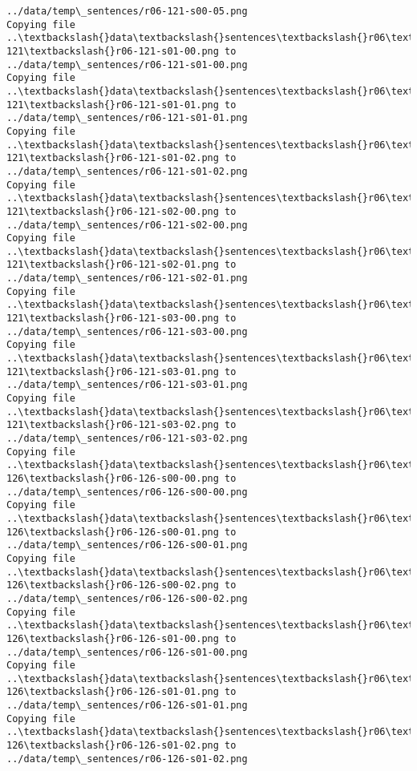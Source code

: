 \documentclass[11pt]{article}
\begin{document}
\begin{Verbatim}[commandchars=\\\{\}]
../data/temp\_sentences/r06-121-s00-05.png
Copying file ..\textbackslash{}data\textbackslash{}sentences\textbackslash{}r06\textbackslash{}r06-121\textbackslash{}r06-121-s01-00.png to
../data/temp\_sentences/r06-121-s01-00.png
Copying file ..\textbackslash{}data\textbackslash{}sentences\textbackslash{}r06\textbackslash{}r06-121\textbackslash{}r06-121-s01-01.png to
../data/temp\_sentences/r06-121-s01-01.png
Copying file ..\textbackslash{}data\textbackslash{}sentences\textbackslash{}r06\textbackslash{}r06-121\textbackslash{}r06-121-s01-02.png to
../data/temp\_sentences/r06-121-s01-02.png
Copying file ..\textbackslash{}data\textbackslash{}sentences\textbackslash{}r06\textbackslash{}r06-121\textbackslash{}r06-121-s02-00.png to
../data/temp\_sentences/r06-121-s02-00.png
Copying file ..\textbackslash{}data\textbackslash{}sentences\textbackslash{}r06\textbackslash{}r06-121\textbackslash{}r06-121-s02-01.png to
../data/temp\_sentences/r06-121-s02-01.png
Copying file ..\textbackslash{}data\textbackslash{}sentences\textbackslash{}r06\textbackslash{}r06-121\textbackslash{}r06-121-s03-00.png to
../data/temp\_sentences/r06-121-s03-00.png
Copying file ..\textbackslash{}data\textbackslash{}sentences\textbackslash{}r06\textbackslash{}r06-121\textbackslash{}r06-121-s03-01.png to
../data/temp\_sentences/r06-121-s03-01.png
Copying file ..\textbackslash{}data\textbackslash{}sentences\textbackslash{}r06\textbackslash{}r06-121\textbackslash{}r06-121-s03-02.png to
../data/temp\_sentences/r06-121-s03-02.png
Copying file ..\textbackslash{}data\textbackslash{}sentences\textbackslash{}r06\textbackslash{}r06-126\textbackslash{}r06-126-s00-00.png to
../data/temp\_sentences/r06-126-s00-00.png
Copying file ..\textbackslash{}data\textbackslash{}sentences\textbackslash{}r06\textbackslash{}r06-126\textbackslash{}r06-126-s00-01.png to
../data/temp\_sentences/r06-126-s00-01.png
Copying file ..\textbackslash{}data\textbackslash{}sentences\textbackslash{}r06\textbackslash{}r06-126\textbackslash{}r06-126-s00-02.png to
../data/temp\_sentences/r06-126-s00-02.png
Copying file ..\textbackslash{}data\textbackslash{}sentences\textbackslash{}r06\textbackslash{}r06-126\textbackslash{}r06-126-s01-00.png to
../data/temp\_sentences/r06-126-s01-00.png
Copying file ..\textbackslash{}data\textbackslash{}sentences\textbackslash{}r06\textbackslash{}r06-126\textbackslash{}r06-126-s01-01.png to
../data/temp\_sentences/r06-126-s01-01.png
Copying file ..\textbackslash{}data\textbackslash{}sentences\textbackslash{}r06\textbackslash{}r06-126\textbackslash{}r06-126-s01-02.png to
../data/temp\_sentences/r06-126-s01-02.png

\end{Verbatim}
\end{document}
